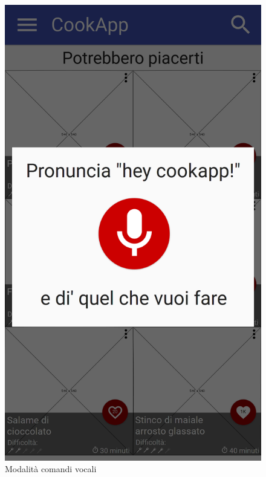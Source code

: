 \begin{figure}[H]
\begin{minipage}{.49\textwidth}
		\includegraphics[width=\textwidth]{img/wireframe/homepage_start_audio.png}
		\caption{Modalità comandi vocali}
	\end{minipage}
\end{figure}
